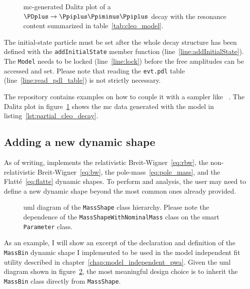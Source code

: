         
        \begin{figure}
            \centering
            
            \caption{\ac{mc}-generated Dalitz plot of a $\PDplus \to \Ppiplus\Ppiminus\Ppiplus$ decay with the resonance content summarized in table~\ref{tab:cleo_model}.}
            \label{fig:partial_cleo_decay}
        \end{figure}
        The initial-state particle must be set after the whole decay structure has been defined with the \lstinline!addInitialState! member function (line~\ref{line:addInitialState}).
        The \lstinline!Model! needs to be locked (line~\ref{line:lock}) before the free amplitudes can be accessed and set.
        Please note that reading the \texttt{evt.pdl} table (line~\ref{line:read_pdl_table}) is not strictly necessary.


        The  repository contains examples on how to couple it with a sampler like ~\cite{Caldwell20092197}.
        The Dalitz plot in figure~\ref{fig:partial_cleo_decay} shows the \ac{mc} data generated with the model in listing~\ref{lst:partial_cleo_decay}.


        \subsection{Adding a new dynamic shape}

        As of writing,  implements the relativistic Breit-Wigner~\eqref{eq:rbw}, the non-relativistic Breit-Wigner~\eqref{eq:bw}, the pole-mass~\eqref{eq:pole_mass}, and the Flatté~\eqref{eq:flatte} dynamic shapes.
        To perform and analysis, the user may need to define a new dynamic shape beyond the most common ones already provided.


    \begin{figure}
        \centering
        
        \caption{\Ac{uml} diagram of the \lstinline!MassShape! class hierarchy.
                 Please note the dependence of the \lstinline!MassShapeWithNominalMass! class on the smart \lstinline!Parameter! class.}
        \label{fig:mass_shape_hierarchy}
    \end{figure}
    As an example, I will show an excerpt of the declaration and definition of the \lstinline!MassBin! dynamic shape I implemented to be used in the model independent fit utility described in chapter~\ref{chap:model_independent_pwa}.
    Given the \ac{uml} diagram shown in figure~\ref{fig:mass_shape_hierarchy}, the most meaningful design choice is to inherit the \lstinline!MassBin! class directly from \lstinline!MassShape!.
    
